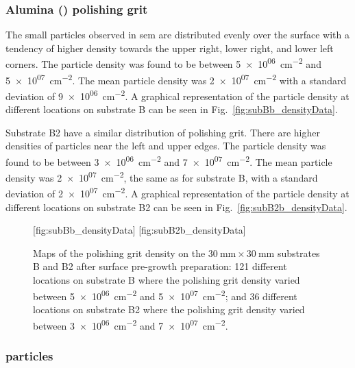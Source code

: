 \subsubsection{Alumina () polishing grit}

The small particles observed in \ac{sem} are distributed evenly over the surface with a tendency of higher density towards the upper right, lower right, and lower left corners. The particle density was found to be between \SI{5e+06}{\centi\metre^{-2}} and \SI{5e+07}{\centi\metre^{-2}}. The mean particle density was \SI{2e+07}{\centi\metre^{-2}} with a standard deviation of \SI{9e+06}{\centi\metre^{-2}}. A graphical representation of the particle density at different locations on substrate B can be seen in Fig.~\ref{fig:subBb_densityData}.

Substrate B2 have a similar distribution of polishing grit. There are higher densities of particles near the left and upper edges. The particle density was found to be between \SI{3e+06}{\centi\metre^{-2}} and \SI{7e+07}{\centi\metre^{-2}}. The mean particle density was \SI{2e+07}{\centi\metre^{-2}}, the same as for substrate B, with a standard deviation of \SI{2e+07}{\centi\metre^{-2}}. A graphical representation of the particle density at different locations on substrate B2 can be seen in Fig.~\ref{fig:subB2b_densityData}.

\begin{figure}[htbp]
    \centering
    [fig:subBb_densityData]
    \hfill
    [fig:subB2b_densityData]
    \caption[Maps of the polishing grit density on substrates B and B2 after surface pre-growth preparation.]{Maps of the polishing grit density on the $\SI{30}{\milli\metre}\times\SI{30}{\milli\metre}$ substrates B and B2 after surface pre-growth preparation:  121 different locations on substrate B where the polishing grit density varied between \SI{5e+06}{\centi\metre^{-2}} and \SI{5e+07}{\centi\metre^{-2}}; and  36 different locations on substrate B2 where the polishing grit density varied between \SI{3e+06}{\centi\metre^{-2}} and \SI{7e+07}{\centi\metre^{-2}}.}
    \label{fig:subBb_and_subB2b_densityData}
\end{figure}

\subsubsection{ particles}
\todo{}

